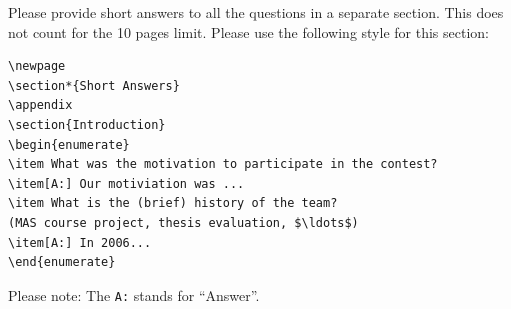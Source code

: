 \documentclass{llncs}
\begin{document}
Please provide short answers to all the questions in a separate section. This
does not count for the 10 pages limit. Please use the following style for this section:

\begin{verbatim}
\newpage
\section*{Short Answers}
\appendix
\section{Introduction}
\begin{enumerate}
\item What was the motivation to participate in the contest?
\item[A:] Our motiviation was ...
\item What is the (brief) history of the team?
(MAS course project, thesis evaluation, $\ldots$)
\item[A:] In 2006...
\end{enumerate}
\end{verbatim}
Please note: The \verb|A:| stands for "`Answer"'.

{}

\end{document}
